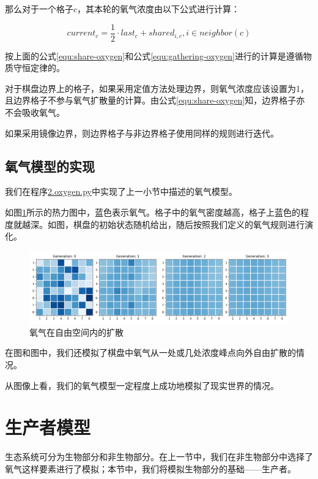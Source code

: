 \documentclass{ctexart}
\begin{document}
那么对于一个格子$c$，其本轮的氧气浓度由以下公式进行计算：

\begin{equation}
  \label{equ:gathering-oxygen}
  current_c = \frac{1}{2} \cdot last_c + shared_{i, c} , i \in neighbor(c)
\end{equation}

按上面的公式\ref{equ:share-oxygen}和公式\ref{equ:gathering-oxygen}进行的计算是遵循物质守恒定律的。

对于棋盘边界上的格子，如果采用定值方法处理边界，则氧气浓度应该设置为1，且边界格子不参与氧气扩散量的计算。由公式\ref{equ:share-oxygen}知，边界格子亦不会吸收氧气。

如果采用镜像边界，则边界格子与非边界格子使用同样的规则进行迭代。

\subsection{氧气模型的实现}

我们在程序\underline{2.oxygen.py}中实现了上一小节中描述的氧气模型。

如图\ref{fig:oxygen-flow}所示的热力图中，蓝色表示氧气。格子中的氧气密度越高，格子上蓝色的程度就越深。如图，棋盘的初始状态随机给出，随后按照我们定义的氧气规则进行演化。

\begin{figure}[ht]
  \centering
  \includegraphics[width=\textwidth]{oxygen-flow.png}
  \caption{氧气在自由空间内的扩散}
  \label{fig:oxygen-flow}
\end{figure}

在图和图中，我们还模拟了棋盘中氧气从一处或几处浓度峰点向外自由扩散的情况。

从图像上看，我们的氧气模型一定程度上成功地模拟了现实世界的情况。

\section{生产者模型}

生态系统可分为生物部分和非生物部分。在上一节中，我们在非生物部分中选择了氧气这样要素进行了模拟；本节中，我们将模拟生物部分的基础——生产者。
\end{document}
